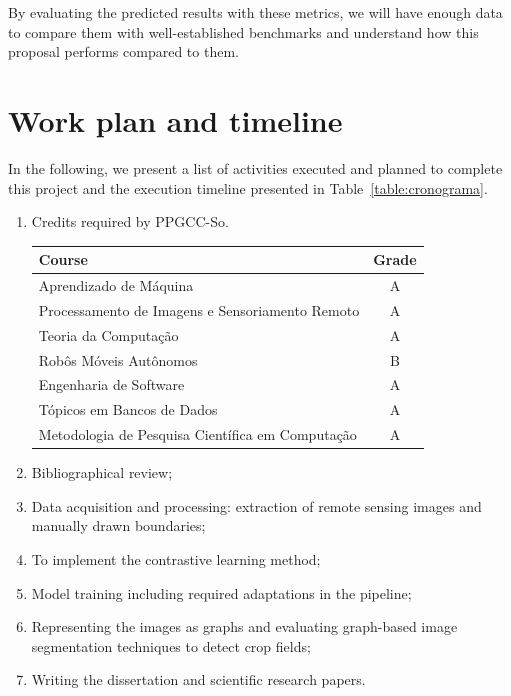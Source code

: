 \documentclass[12pt]{article}
\begin{document}
By evaluating the predicted results with these metrics, we will have enough data to compare them with well-established benchmarks and understand how this proposal performs compared to them.

\section{Work plan and timeline}\label{section:planotrabalho}

In the following, we present a list of activities executed and planned to complete this project and the execution timeline presented in Table~\ref{table:cronograma}.

\begin{enumerate}
	\item Credits required by PPGCC-So.

\begin{center}
	\begin{tabular}{|l|c|}
		\hline
		\textbf{Course} & \textbf{Grade} \\ \hline
		Aprendizado de Máquina & A \\ \hline
		Processamento de Imagens e Sensoriamento Remoto & A \\ \hline
		Teoria da Computação & A \\ \hline
		Robôs Móveis Autônomos & B \\ \hline
		Engenharia de Software & A \\ \hline
		Tópicos em Bancos de Dados & A \\ \hline
		Metodologia de Pesquisa Científica em Computação & A \\ \hline
	\end{tabular}
\end{center}	

	\item Bibliographical review;
	\item Data acquisition and processing: extraction of remote sensing images and manually drawn boundaries;
	\item To implement the contrastive learning method;
	\item Model training including required adaptations in the pipeline;
	\item Representing the images as graphs and evaluating graph-based image segmentation techniques to detect crop fields;
	\item Writing the dissertation and scientific research papers.


\end{enumerate}
\end{document}
